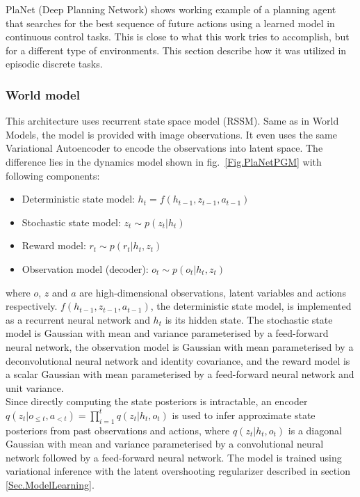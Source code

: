 PlaNet (Deep Planning Network) \cite{Algo.PlaNet} shows working example of a planning agent that searches for the best sequence of future actions using a learned model in continuous control tasks. This is close to what this work tries to accomplish, but for a different type of environments. This section describe how it was utilized in episodic discrete tasks.

\subsubsection{World model}

This architecture uses recurrent state space model (RSSM). Same as in World Models, the model is provided with image observations. It even uses the same Variational Autoencoder to encode the observations into latent space. The difference lies in the dynamics model shown in fig.~\ref{Fig.PlaNetPGM} with following components:
\begin{itemize}
\item Deterministic state model:             $h_t = f(h_{t-1}, z_{t-1}, a_{t-1})$
\item Stochastic state model:                $z_t \sim p(z_t|h_t)$
\item Reward model:                          $r_t \sim p(r_t|h_t, z_t)$
\item Observation model (decoder):           $o_t \sim p(o_t|h_t, z_t)$
\end{itemize}
where $o$, $z$ and $a$ are high-dimensional observations, latent variables and actions respectively. $f(h_{t-1}, z_{t-1}, a_{t-1})$, the deterministic state model, is implemented as a recurrent neural network and $h_t$ is its hidden state. The stochastic state model is Gaussian with mean and variance parameterised by a feed-forward neural network, the observation model is Gaussian with mean parameterised by a deconvolutional neural network and identity covariance, and the reward model is a scalar Gaussian with mean parameterised by a feed-forward neural network and unit variance. \\
Since directly computing the state posteriors is intractable, an encoder $q(z_t|o_{\leqslant t}, a_{< t}) = \prod_{i=1}^tq(z_t|h_t,o_t)$ is used to infer approximate state posteriors from past observations and actions, where $q(z_t | h_t, o_t)$ is a diagonal Gaussian with mean and variance parameterised by a convolutional neural network followed by a feed-forward neural network. The model is trained using variational inference with the latent overshooting regularizer described in section \ref{Sec.ModelLearning}.

